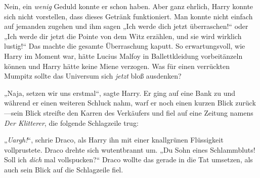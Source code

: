 Nein, ein \emph{wenig} Geduld konnte er schon haben. Aber ganz ehrlich, Harry konnte sich nicht vorstellen, dass dieses Getränk funktioniert. Man konnte nicht einfach auf jemanden zugehen und ihm sagen „Ich werde dich jetzt überraschen!“ oder „Ich werde dir jetzt die Pointe von dem Witz erzählen, und sie wird wirklich lustig!“ Das machte die gesamte Überraschung kaputt. So erwartungsvoll, wie Harry im Moment war, hätte Lucius Malfoy in Ballettkleidung vorbeitänzeln können und Harry hätte keine Miene verzogen. Was für einen verrückten Mumpitz sollte das Universum sich \emph{jetzt} bloß ausdenken?

„Naja, setzen wir uns erstmal“, sagte Harry. Er ging auf eine Bank zu und während er einen weiteren Schluck nahm, warf er noch einen kurzen Blick zurück—sein Blick streifte den Karren des Verkäufers und fiel auf eine Zeitung namens \emph{Der Klitterer}, die folgende Schlagzeile trug:


„\emph{Uargh!}“, schrie Draco, als Harry ihn mit einer knallgrünen Flüssigkeit vollprustete. Draco drehte sich wutentbrannt um. „Du Sohn eines Schlammbluts! Soll ich \emph{dich} mal vollspucken?“ Draco wollte das gerade in die Tat umsetzen, als auch sein Blick auf die Schlagzeile fiel.

